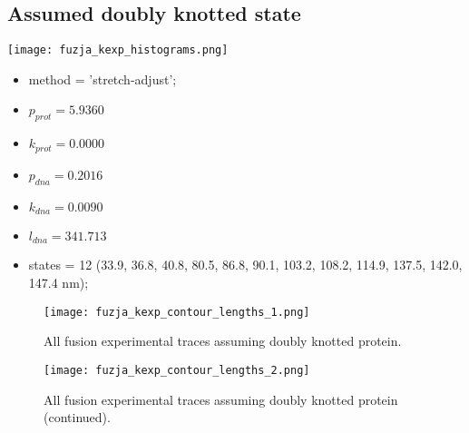 \subsection{Assumed doubly knotted state}
\label{subsec:fit-details-fusion-experiment-doubly}
\begin{minipage}[c]{0.7\textwidth}
    \texttt{[image: fuzja\_kexp\_histograms.png]}
\end{minipage}
\hfill
\begin{minipage}[c]{0.45\textwidth}
    \begin{itemize}
        \item method = 'stretch-adjust';
        \item $p_{prot}=5.9360$
        \item $k_{prot}=0.0000$
        \item $p_{dna}=0.2016$
        \item $k_{dna}=0.0090$
        \item $l_{dna}=341.713$
        \item states = 12 (33.9, 36.8, 40.8, 80.5, 86.8, 90.1, 103.2, 108.2, 114.9, 137.5, 142.0, 147.4 nm);
    \end{itemize}
\end{minipage}

\begin{figure}
    \centering
    \texttt{[image: fuzja\_kexp\_contour\_lengths\_1.png]}
    \caption{All fusion experimental traces assuming doubly knotted protein.}
    \label{fig:doubly-fusion-kexp-cl1}
\end{figure}

\begin{figure}
    \centering
    \texttt{[image: fuzja\_kexp\_contour\_lengths\_2.png]}
    \caption{All fusion experimental traces assuming doubly knotted protein (continued).}
    \label{fig:doubly-fusion-exp-cl2}
\end{figure}

